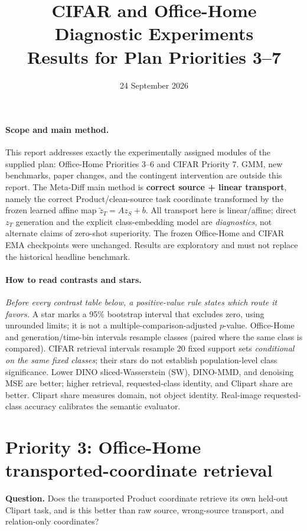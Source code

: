 \documentclass[10pt]{article}
\title{CIFAR and Office-Home Diagnostic Experiments\\\large Results for Plan Priorities 3--7}
\author{}
\date{24 September 2026}
\newcommand{\mname}{\textbf{correct source + linear transport}}
\begin{document}
\maketitle
\vspace{-1.5em}

\paragraph{Scope and main method.}
This report addresses exactly the experimentally assigned modules of the supplied plan: Office-Home Priorities 3--6 and CIFAR Priority 7. GMM, new benchmarks, paper changes, and the contingent intervention are outside this report. The Meta-Diff main method is \mname, namely the correct Product/clean-source task coordinate transformed by the frozen learned affine map $\widetilde z_T=Az_S+b$. All transport here is linear/affine; direct $z_T$ generation and the explicit class-embedding model are \emph{diagnostics}, not alternate claims of zero-shot superiority. The frozen Office-Home and CIFAR EMA checkpoints were unchanged. Results are exploratory and must not replace the historical headline benchmark.

\paragraph{How to read contrasts and stars.}
\emph{Before every contrast table below, a positive-value rule states which route it favors.} A star marks a 95\% bootstrap interval that excludes zero, using unrounded limits; it is not a multiple-comparison-adjusted $p$-value. Office-Home and generation/time-bin intervals resample classes (paired where the same class is compared). CIFAR retrieval intervals resample 20 fixed support sets \emph{conditional on the same fixed classes}; their stars do not establish population-level class significance. Lower DINO sliced-Wasserstein (SW), DINO-MMD, and denoising MSE are better; higher retrieval, requested-class identity, and Clipart share are better. Clipart share measures domain, not object identity. Real-image requested-class accuracy calibrates the semantic evaluator.

\section*{Priority 3: Office-Home transported-coordinate retrieval}

\textbf{Question.} Does the transported Product coordinate retrieve its own held-out Clipart task, and is this better than raw source, wrong-source transport, and relation-only coordinates?
\end{document}
